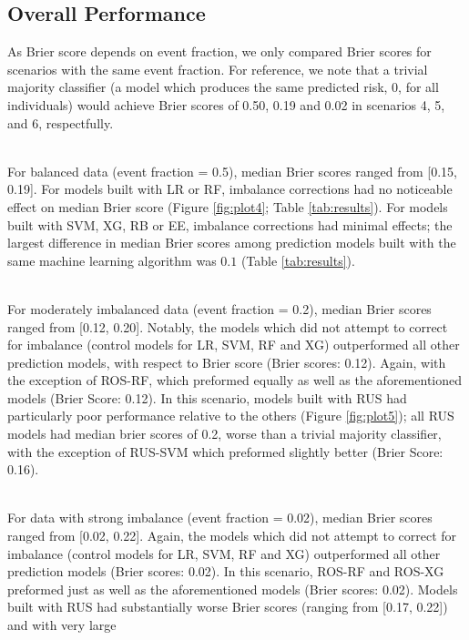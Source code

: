 \documentclass[AMA,STIX1COL,]{WileyNJD-v2}
\begin{document}
\hypertarget{overall-performance}{%
\subsection{Overall Performance}\label{overall-performance}}

\hfill\break
As Brier score depends on event fraction, we only compared Brier scores
for scenarios with the same event fraction. For reference, we note that
a trivial majority classifier (a model which produces the same predicted
risk, 0, for all individuals) would achieve Brier scores of 0.50, 0.19
and 0.02 in scenarios 4, 5, and 6, respectfully.\\
\strut \\
For balanced data (event fraction = 0.5), median Brier scores ranged
from {[}0.15, 0.19{]}. For models built with LR or RF, imbalance
corrections had no noticeable effect on median Brier score (Figure
\ref{fig:plot4}; Table \ref{tab:results}). For models built with SVM,
XG, RB or EE, imbalance corrections had minimal effects; the largest
difference in median Brier scores among prediction models built with the
same machine learning algorithm was \(0.1\) (Table \ref{tab:results}).\\
\strut \\
For moderately imbalanced data (event fraction = 0.2), median Brier
scores ranged from {[}0.12, 0.20{]}. Notably, the models which did not
attempt to correct for imbalance (control models for LR, SVM, RF and XG)
outperformed all other prediction models, with respect to Brier score
(Brier scores: 0.12). Again, with the exception of ROS-RF, which
preformed equally as well as the aforementioned models (Brier Score:
0.12). In this scenario, models built with RUS had particularly poor
performance relative to the others (Figure \ref{fig:plot5}); all RUS
models had median brier scores of 0.2, worse than a trivial majority
classifier, with the exception of RUS-SVM which preformed slightly
better (Brier Score: 0.16).\\
\strut \\
For data with strong imbalance (event fraction = 0.02), median Brier
scores ranged from {[}0.02, 0.22{]}. Again, the models which did not
attempt to correct for imbalance (control models for LR, SVM, RF and XG)
outperformed all other prediction models (Brier scores: 0.02). In this
scenario, ROS-RF and ROS-XG preformed just as well as the aforementioned
models (Brier scores: 0.02). Models built with RUS had substantially
worse Brier scores (ranging from {[}0.17, 0.22{]}) and with very large
\end{document}
